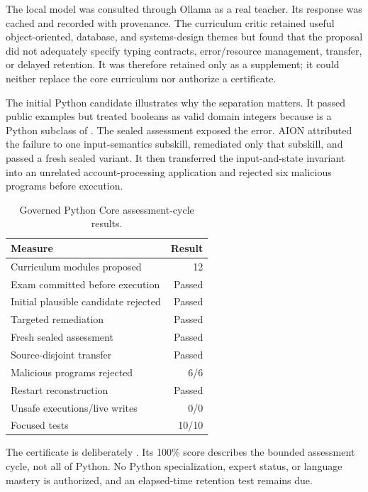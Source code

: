 The local  model was consulted through Ollama as a real teacher.
Its response was cached and recorded with provenance.  The curriculum critic
retained useful object-oriented, database, and systems-design themes but found
that the proposal did not adequately specify typing contracts,
error/resource management, transfer, or delayed retention.  It was therefore
retained only as a supplement; it could neither replace the core curriculum nor
authorize a certificate.

The initial Python candidate illustrates why the separation matters.  It
passed public examples but treated booleans as valid domain integers because
 is a Python subclass of .  The sealed assessment exposed
the error.  AION attributed the failure to one input-semantics subskill,
remediated only that subskill, and passed a fresh sealed variant.  It then
transferred the input-and-state invariant into an unrelated account-processing
application and rejected six malicious programs before execution.

\begin{table}[htbp]
\centering
\caption{Governed Python Core assessment-cycle results.}
\label{tab:governed-python-cycle}
\begin{tabular}{@{}lr@{}}
\toprule
Measure & Result \\
\midrule
Curriculum modules proposed & 12 \\
Exam committed before execution & Passed \\
Initial plausible candidate rejected & Passed \\
Targeted remediation & Passed \\
Fresh sealed assessment & Passed \\
Source-disjoint transfer & Passed \\
Malicious programs rejected & 6/6 \\
Restart reconstruction & Passed \\
Unsafe executions/live writes & 0/0 \\
Focused tests & 10/10 \\
\bottomrule
\end{tabular}
\end{table}

The certificate  is deliberately
.  Its 100\% score describes the bounded assessment
cycle, not all of Python.  No Python specialization, expert status, or language
mastery is authorized, and an elapsed-time retention test remains due.

